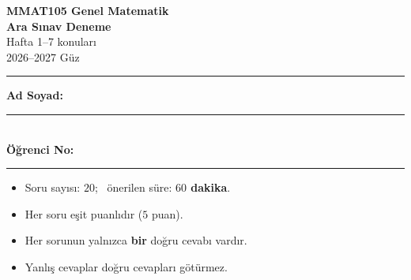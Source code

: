 \documentclass[11pt,a4paper]{article}
\begin{document}
\begin{minipage}[c]{\textwidth}
{\LARGE\bfseries\color{anamavi} MMAT105 Genel Matematik}\\[4pt]
{\large\bfseries Ara Sınav Deneme}\\[2pt]
{\normalsize Hafta 1--7 konuları}\\[6pt]
{\small 2026--2027 Güz}
\end{minipage}

\vspace{4pt}\noindent\textcolor{anamavi}{\rule{\textwidth}{1pt}}

\begin{minipage}[t]{0.55\textwidth}
\vspace{2pt}
\textbf{Ad Soyad:} \rule{0.68\linewidth}{0.4pt}\\[12pt]
\textbf{Öğrenci No:} \rule{0.6\linewidth}{0.4pt}
\end{minipage}\hfill
\begin{minipage}[t]{0.42\textwidth}
\begin{kural}[Yönerge]
\small\raggedright
\begin{itemize}[leftmargin=*,itemsep=0pt,topsep=0pt]
\item Soru sayısı: \(20\); \ önerilen süre: \textbf{\(60\) dakika}.
\item Her soru eşit puanlıdır (\(5\) puan).
\item Her sorunun yalnızca \textbf{bir} doğru cevabı vardır.
\item Yanlış cevaplar doğru cevapları götürmez.
\end{itemize}
\end{kural}
\end{minipage}
\end{document}
